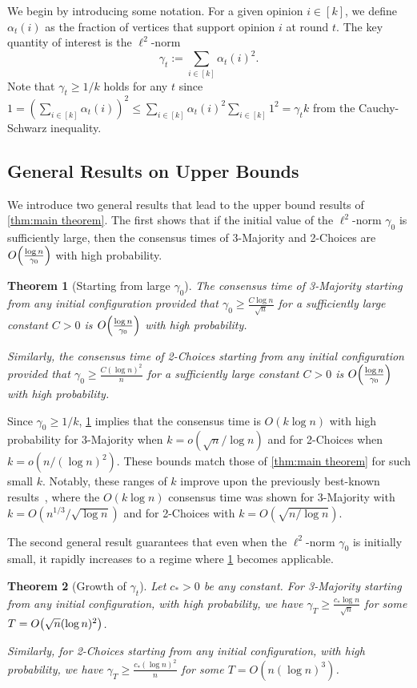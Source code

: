 \documentclass[letterpaper,11pt]{article}
\newtheorem{theorem}{Theorem}[section]
\newcommand{\alphanorm}{\gamma}
\begin{document}
We begin by introducing some notation.
For a given opinion $i\in [k]$, we define $\alpha_t(i)$ as the fraction of vertices that support opinion $i$ at round $t$. 
The key quantity of interest is the $\ell^2$-norm $$\alphanorm_t := \sum_{i\in [k]} \alpha_t(i)^2.$$
Note that $\alphanorm_t\geq 1/k$ holds for any $t$
since $1=(\sum_{i\in [k]}\alpha_t(i))^2\leq \sum_{i\in [k]}\alpha_t(i)^2\sum_{i\in [k]}1^2=\alphanorm_t k$ from the Cauchy-Schwarz inequality.
\subsection{General Results on Upper Bounds}
We introduce two general results that lead to the upper bound results of \cref{thm:main theorem}. 
The first shows that if the initial value of the $\ell^2$-norm $\alphanorm_0$ is sufficiently large, 
then the consensus times of 3-Majority and 2-Choices are $O\qty(\frac{\log n}{\alphanorm_0})$ with high probability.

\begin{theorem}[Starting from large $\alphanorm_0$] \label{thm:consensus time large alphanorm}
  The consensus time of 3-Majority starting from any initial configuration provided that $\alphanorm_0 \ge \frac{C\log n}{\sqrt{n}}$ for a sufficiently large constant $C>0$ is $O\qty(\frac{\log n}{\alphanorm_0})$ with high probability.

  Similarly, the consensus time of 2-Choices starting from any initial configuration provided that $\alphanorm_0 \ge \frac{C(\log n)^2}{n}$ for a sufficiently large constant $C>0$ is $O\qty(\frac{\log n}{\alphanorm_0})$ with high probability.
\end{theorem}
Since $\alphanorm_0 \geq 1/k$, \cref{thm:consensus time large alphanorm} implies that the consensus time is $O(k \log n)$ with high probability for 3-Majority when $k =o( \sqrt{n}/\log n)$ and for 2-Choices when $k =o( n/(\log n)^2)$. These bounds match those of \cref{thm:main theorem} for such small $k$. Notably, these ranges of $k$ improve upon the previously best-known results~\cite{nearly_tight_analysis}, where the $O(k \log n)$ consensus time was shown for 3-Majority with $k = O(n^{1/3}/\sqrt{\log n})$ and for 2-Choices with $k = O(\sqrt{n/\log n})$.

The second general result guarantees that even when the $\ell^2$-norm $\alphanorm_0$ is initially small, it rapidly increases to a regime where \cref{thm:consensus time large alphanorm} becomes applicable.

\begin{theorem}[Growth of $\alphanorm_t$] \label{thm:growth of alphanorm}
  Let $c_*>0$ be any constant.
  For 3-Majority starting from any initial configuration, with high probability, we have $\alphanorm_T \ge \frac{c_*\log n}{\sqrt{n}}$ for some $T=O\qty(\sqrt{n}(\log n)^{2})$.

  Similarly, for 2-Choices starting from any initial configuration, with high probability, we have $\alphanorm_T \ge \frac{c_*(\log n)^2}{n}$ for some $T=O(n(\log n)^3)$.
\end{theorem}
\end{document}
